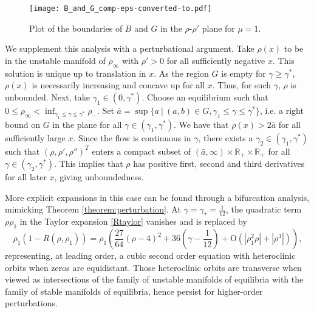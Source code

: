 \documentclass[10pt]{article}
\newcommand{\rmO}{\mathrm{O}}
\renewcommand{\leq}{\leqslant}
\renewcommand{\geq}{\geqslant}
\begin{document}
\begin{figure}[H]
\centering
\texttt{[image: B\_and\_G\_comp-eps-converted-to.pdf]}
\caption{Plot of the boundaries of $B$ and $G$ in the $\rho$-$\rho'$ plane for $\mu = 1$.}
\end{figure}
\label{goob_boog}
We supplement this analysis with a perturbational argument.  Take $\rho(x)$ to be in the unstable manifold of $\rho_\infty$ with $\rho' > 0$ for all sufficiently negative $x$.  This solution is unique up to translation in $x$.   As the region $G$ is empty for $\gamma \geq \gamma^*$, $\rho(x)$ is necessarily increasing and concave up for all $x$.  Thus, for such $\gamma$, $\rho$ is unbounded.  Next, take $\gamma_1 \in (0,\gamma^*)$.    Choose an equilibrium such that
$0\leq \rho_\infty < \inf_{\gamma_1 \leq \gamma \leq \gamma^*} \rho_-$.  Set $\bar a= \sup\{a \ | \ (a,b) \in G,\gamma_1 \leq \gamma \leq \gamma^*\}$, i.e. a right bound on $G$ in the plane for all $\gamma \in (\gamma_1,\gamma^*)$.  We have that $\rho(x) > 2\bar a$ for all sufficiently large $x$.  Since the flow is continuous in $\gamma$, there exists a $\gamma_2 \in (\gamma_1,\gamma^*)$ such that $(\rho,\rho',\rho'')^T$ enters a compact subset of $(\bar a,\infty)\times\mathbb{R}_+\times\mathbb{R}_+$ for all $\gamma \in (\gamma_2,\gamma^*)$.  This implies that $\rho$ has positive first, second and third derivatives for all later $x$, giving unboundedness. 

More explicit expansions in this case can be found through a bifurcation analysis, mimicking Theorem \ref{theorem:perturbation}. At $\gamma=\gamma_*=\frac{1}{12}$, the quadratic term $\rho\rho_1$ in the Taylor expansion  \eqref{Rtaylor} vanishes and is replaced by
\[
 \rho_1\left(1-R(\rho,\rho_1)\right)=\rho_1\left(\frac{27}{64}(\rho-4)^2+36\left(\gamma-\frac{1}{12}\right)+\rmO(|\rho_1^2\rho|+|\rho^3|)\right),
\]
representing, at leading order, a cubic second order equation with heteroclinic orbits when zeros are equidistant. Those heteroclinic orbits are transverse when viewed as intersections of the family of unstable manifolds of equilibria with the family of stable manifolds of equilibria, hence persist for higher-order perturbations.
\end{document}
